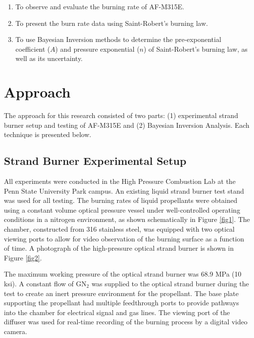 \documentclass{article}
\begin{document}
\begin{enumerate}
\item To observe and evaluate the burning rate of AF-M315E.
\item To present the burn rate data using Saint-Robert's burning law.
\item To use Bayesian Inversion methods to determine the pre-exponential coefficient ($A$) and pressure exponential
($n$) of Saint-Robert's burning law, as well as its uncertainty.
\end{enumerate}

\section{Approach} \label{approach}

The approach for this research consisted of two parts: (1) experimental strand burner setup and testing of AF-M315E
and (2) Bayesian Inversion Analysis. Each technique is presented below.

\subsection{Strand Burner Experimental Setup} \label{experSetup}

All experiments were conducted in the High Pressure Combustion Lab at the Penn State University Park campus. An 
existing liquid strand burner test stand was used for all testing. The burning rates of liquid propellants were
obtained using a constant volume optical pressure vessel under well-controlled operating conditions in a nitrogen
environment, as shown schematically in Figure \ref{fig1}. The chamber, constructed from 316 stainless steel, was
equipped with two optical viewing ports to allow for video observation of the burning surface as a function of
time. A photograph of the high-pressure optical strand burner is shown in Figure \ref{fig2}.

The maximum working pressure of the optical strand burner was 68.9 MPa (10 ksi). A constant flow of GN$_2$ was
supplied to the optical strand burner during the test to create an inert pressure environment for the propellant.
The base plate supporting the propellant had multiple feedthrough ports to provide pathways into the chamber for
electrical signal and gas lines. The viewing port of the diffuser was used for real-time recording of the burning
process by a digital video camera.
\end{document}
